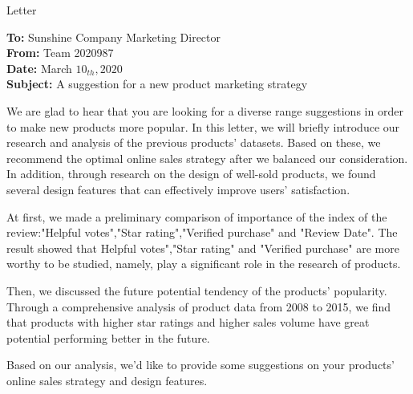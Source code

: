 \documentclass[12pt]{article}  %
\begin{document}
\begin{letter}{Letter}
\begin{flushleft}  %
\textbf{To:} Sunshine Company Marketing Director\\
\textbf{From:} Team 2020987\\
\textbf{Date:} March $10_{th}, 2020$\\
\textbf{Subject:} A suggestion for a new product marketing strategy
\end{flushleft}

We are glad to hear that you are looking for a diverse range suggestions in order to make new products more popular. In this letter, we will briefly introduce our research and analysis of the previous products' datasets. Based on these, we recommend the optimal online sales strategy after we balanced our consideration. In addition, through research on the design of well-sold products, we found several design features that can effectively improve users' satisfaction.

At first, we made a preliminary comparison of importance of the index of the review:"Helpful votes","Star rating","Verified purchase" and "Review Date". The result showed that Helpful votes","Star rating" and "Verified purchase" are more worthy to be studied, namely, play a significant role in the research of products.

Then, we discussed the future potential tendency of the products' popularity. Through a comprehensive analysis of product data from 2008 to 2015, we find that products with higher star ratings and higher sales volume have great potential performing better in the future.



Based on our analysis, we'd like to provide some suggestions on your products' online sales strategy and design features.


\end{letter}
\end{document}
